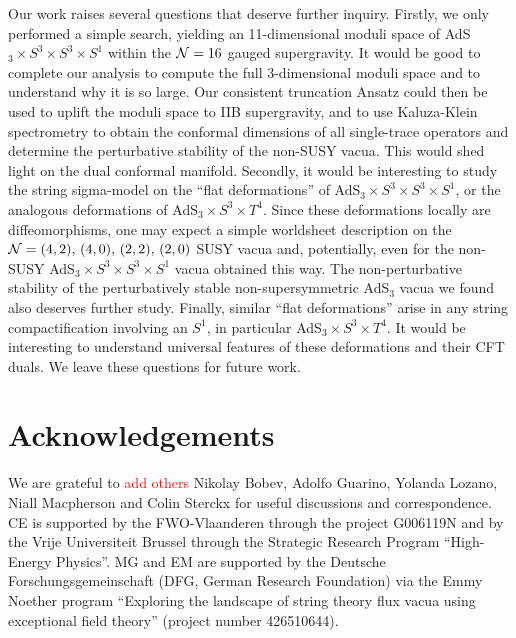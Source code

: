 \documentclass[a4paper, 11pt]{article}
\numberwithin{equation}{section}
\newcommand{\+}{\oplus}
\newcommand{\EM}[1]{\textcolor{red}{#1}}
\begin{document}
Our work raises several questions that deserve further inquiry. Firstly, we only performed a simple search, yielding an 11-dimensional moduli space of AdS$_3 \times S^3 \times S^3 \times S^1$ within the ${\cal N}=16$ gauged supergravity. It would be good to complete our analysis to compute the full 3-dimensional moduli space and to understand why it is so large. Our consistent truncation Ansatz could then be used to uplift the moduli space to IIB supergravity, and to use Kaluza-Klein spectrometry \cite{Malek:2019eaz,Malek:2020yue,Eloy:2020uix} to obtain the conformal dimensions of all single-trace operators and determine the perturbative stability of the non-SUSY vacua. This would shed light on the dual conformal manifold. Secondly, it would be interesting to study the string sigma-model \cite{Eberhardt:2019niq} on the ``flat deformations'' of AdS$_3 \times S^3 \times S^3 \times S^1$, or the analogous deformations of AdS$_3 \times S^3 \times T^4$. Since these deformations locally are diffeomorphisms, one may expect a simple worldsheet description on the ${\cal N}=(4,2),\, (4,0),\, (2,2),\, (2,0)$ SUSY vacua and, potentially, even for the non-SUSY AdS$_3 \times S^3 \times S^3 \times S^1$ vacua obtained this way. The non-perturbative stability of the perturbatively stable non-supersymmetric AdS$_3$ vacua we found also deserves further study. Finally, similar ``flat deformations'' arise in any string compactification involving an $S^1$, in particular AdS$_3 \times S^3 \times T^4$. It would be interesting to understand universal features of these deformations and their CFT duals. We leave these questions for future work.

\section*{Acknowledgements}
We are grateful to \EM{add others} Nikolay Bobev, Adolfo Guarino, Yolanda Lozano, Niall Macpherson and Colin Sterckx for useful discussions and correspondence. CE is supported by the FWO-Vlaanderen through the project G006119N and by the Vrije Universiteit Brussel through the Strategic Research Program ``High-Energy Physics''. MG and EM are supported by the Deutsche Forschungsgemeinschaft (DFG, German Research Foundation) via the Emmy Noether program ``Exploring the landscape of string theory flux vacua using exceptional field theory'' (project number 426510644).

\appendix
\end{document}
